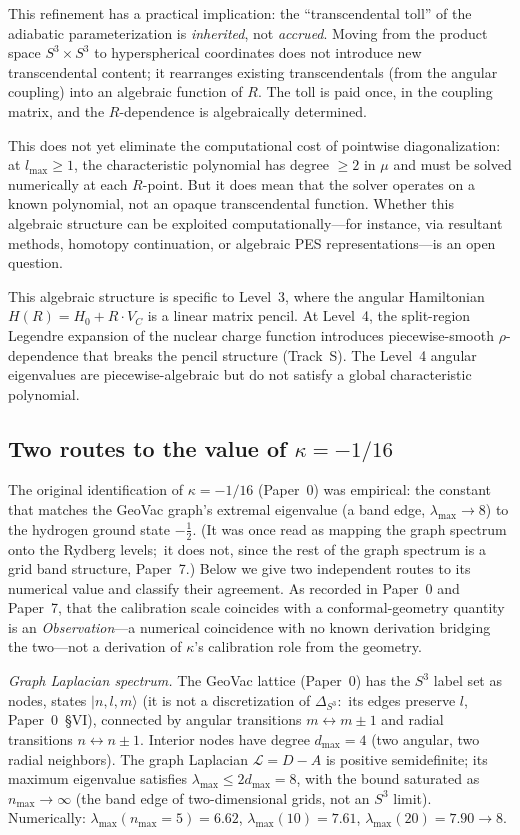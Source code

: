 \documentclass[aps,pra,twocolumn,superscriptaddress,longbibliography]{revtex4-2}
\begin{document}
This refinement has a practical implication: the ``transcendental toll''
of the adiabatic parameterization is \emph{inherited}, not \emph{accrued}.
Moving from the product space $S^3 \times S^3$ to hyperspherical
coordinates does not introduce new transcendental content; it
rearranges existing transcendentals (from the angular coupling)
into an algebraic function of $R$.  The toll is paid once, in the
coupling matrix, and the $R$-dependence is algebraically determined.

This does not yet eliminate the computational cost of pointwise
diagonalization: at $l_{\max} \geq 1$, the characteristic polynomial
has degree $\geq 2$ in $\mu$ and must be solved numerically at each
$R$-point.  But it does mean that the solver operates on a known
polynomial, not an opaque transcendental function.  Whether this
algebraic structure can be exploited computationally---for instance,
via resultant methods, homotopy continuation, or algebraic
PES representations---is an open question.

This algebraic structure is specific to Level~3, where the angular
Hamiltonian $H(R) = H_0 + R \cdot V_C$ is a linear matrix pencil.
At Level~4, the split-region Legendre expansion of the nuclear charge
function introduces piecewise-smooth $\rho$-dependence that breaks
the pencil structure (Track~S).  The Level~4 angular eigenvalues
are piecewise-algebraic but do not satisfy a global characteristic
polynomial.

\subsection{Two routes to the value of $\kappa = -1/16$}
\label{sec:kappa_derivation}

The original identification of $\kappa = -1/16$ (Paper~0) was
empirical: the constant that matches the GeoVac graph's extremal
eigenvalue (a band edge, $\lambda_{\max} \to 8$) to the hydrogen
ground state $-\tfrac12$.  (It was once read as mapping the graph
spectrum onto the Rydberg levels;\ it does not, since the rest of the
graph spectrum is a grid band structure, Paper~7.)  Below we give two independent routes
to its numerical value and classify their agreement.  As recorded in
Paper~0 and Paper~7, that the calibration scale coincides with a
conformal-geometry quantity is an \emph{Observation}---a numerical
coincidence with no known derivation bridging the two---not a
derivation of $\kappa$'s calibration role from the geometry.

\textit{Graph Laplacian spectrum.}  The GeoVac lattice
(Paper~0) has the $S^3$ label set as nodes, states $|n,l,m\rangle$
(it is not a discretization of $\Delta_{S^3}$:\ its edges preserve $l$,
Paper~0~\S VI), connected by angular transitions $m \leftrightarrow m \pm 1$
and radial transitions $n \leftrightarrow n \pm 1$.  Interior
nodes have degree $d_{\max} = 4$ (two angular, two radial
neighbors).  The graph Laplacian $\mathcal{L} = D - A$ is
positive semidefinite; its maximum eigenvalue satisfies
$\lambda_{\max} \leq 2 d_{\max} = 8$, with the bound saturated
as $n_{\max} \to \infty$ (the band edge of two-dimensional grids, not
an $S^3$ limit).  Numerically:
$\lambda_{\max}(n_{\max}{=}5) = 6.62$,
$\lambda_{\max}(10) = 7.61$,
$\lambda_{\max}(20) = 7.90 \to 8$.
\end{document}
